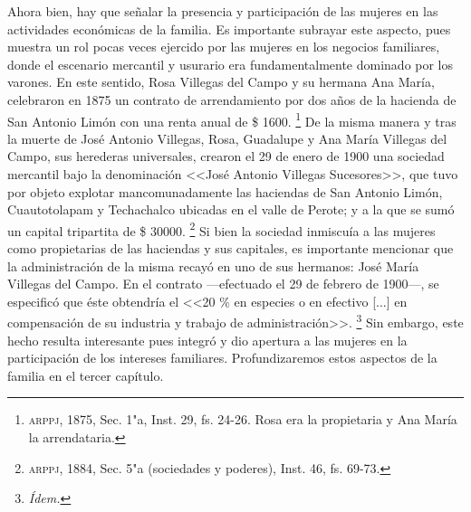 \documentclass[14pt,twoside,final]{extbook} %
\let\oldfootnote\footnote
\renewcommand\footnote[1]{%
\oldfootnote{\hspace{1mm}#1}}
\begin{document}
Ahora bien, hay que señalar la presencia y participación de las mujeres en las actividades económicas de la familia. Es importante subrayar este aspecto, pues muestra un rol pocas veces ejercido por las mujeres en los negocios familiares, donde el escenario mercantil y usurario era fundamentalmente dominado por los varones. En este sentido, Rosa Villegas del Campo y su hermana Ana María, celebraron en 1875 un contrato de arrendamiento por dos años de la hacienda de San Antonio Limón con una renta anual de \$ 1600.\footnote{\textsc{arppj}, 1875, Sec. 1"a, Inst. 29, fs. 24-26. Rosa era la propietaria y Ana María la arrendataria.} De la misma manera y tras la muerte de José Antonio Villegas, Rosa, Guadalupe y Ana María Villegas del Campo, sus herederas universales, crearon el 29 de enero de 1900 una sociedad mercantil bajo la denominación <<José Antonio Villegas Sucesores>>, que tuvo por objeto explotar mancomunadamente las haciendas de San Antonio Limón, Cuautotolapam y Techachalco ubicadas en el valle de Perote; y a la que se sumó un capital tripartita de \$ 30000.\footnote{\textsc{arppj}, 1884, Sec. 5"a (sociedades y poderes), Inst. 46, fs. 69-73.} Si bien la sociedad inmiscuía a las mujeres como propietarias de las haciendas y sus capitales, es importante mencionar que la administración de la misma recayó en uno de sus hermanos: José María Villegas del Campo. En el contrato ---efectuado el 29 de febrero de 1900---, se especificó que éste obtendría el <<20 \% en especies o en efectivo [...] en compensación de su industria y trabajo de administración>>.\footnote{\em Ídem.} Sin embargo, este hecho resulta interesante pues integró y dio apertura a las mujeres en la participación de los intereses familiares. Profundizaremos estos aspectos de la familia en el tercer capítulo.
\end{document}
